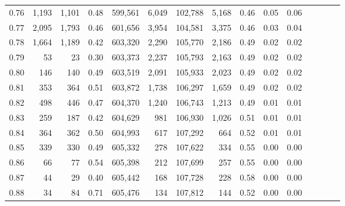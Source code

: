 \begin{tabular}{rrrcrrrrrrrrrrr}
0.76 &   1,193 &  1,101 &                                       0.48 &  599,561 &    6,049 &  102,788 &    5,168 &  0.46 &  0.05 &                         0.06 \\
0.77 &   2,095 &  1,793 &                                       0.46 &  601,656 &    3,954 &  104,581 &    3,375 &  0.46 &  0.03 &                         0.04 \\
0.78 &   1,664 &  1,189 &                                       0.42 &  603,320 &    2,290 &  105,770 &    2,186 &  0.49 &  0.02 &                         0.02 \\
0.79 &      53 &     23 &                                       0.30 &  603,373 &    2,237 &  105,793 &    2,163 &  0.49 &  0.02 &                         0.02 \\
0.80 &     146 &    140 &                                       0.49 &  603,519 &    2,091 &  105,933 &    2,023 &  0.49 &  0.02 &                         0.02 \\
0.81 &     353 &    364 &                                       0.51 &  603,872 &    1,738 &  106,297 &    1,659 &  0.49 &  0.02 &                         0.02 \\
0.82 &     498 &    446 &                                       0.47 &  604,370 &    1,240 &  106,743 &    1,213 &  0.49 &  0.01 &                         0.01 \\
0.83 &     259 &    187 &                                       0.42 &  604,629 &      981 &  106,930 &    1,026 &  0.51 &  0.01 &                         0.01 \\
0.84 &     364 &    362 &                                       0.50 &  604,993 &      617 &  107,292 &      664 &  0.52 &  0.01 &                         0.01 \\
0.85 &     339 &    330 &                                       0.49 &  605,332 &      278 &  107,622 &      334 &  0.55 &  0.00 &                         0.00 \\
0.86 &      66 &     77 &                                       0.54 &  605,398 &      212 &  107,699 &      257 &  0.55 &  0.00 &                         0.00 \\
0.87 &      44 &     29 &                                       0.40 &  605,442 &      168 &  107,728 &      228 &  0.58 &  0.00 &                         0.00 \\
0.88 &      34 &     84 &                                       0.71 &  605,476 &      134 &  107,812 &      144 &  0.52 &  0.00 &                         0.00 \\

\end{tabular}
